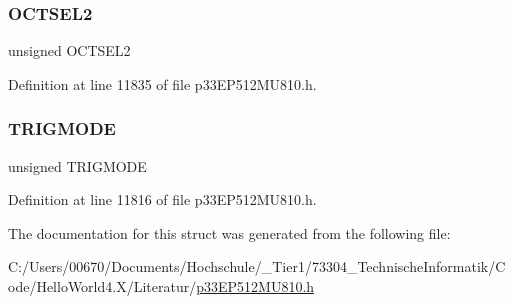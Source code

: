 \subsubsection{\texorpdfstring{O\+C\+T\+S\+E\+L2}{OCTSEL2}}
{\footnotesize\ttfamily unsigned O\+C\+T\+S\+E\+L2}



Definition at line 11835 of file p33\+E\+P512\+M\+U810.\+h.

\mbox{\label{structtag_o_c11_c_o_n1_b_i_t_s_a7a0057e0dca6e2663584b5b9e1da04c3}} 
\subsubsection{\texorpdfstring{T\+R\+I\+G\+M\+O\+DE}{TRIGMODE}}
{\footnotesize\ttfamily unsigned T\+R\+I\+G\+M\+O\+DE}



Definition at line 11816 of file p33\+E\+P512\+M\+U810.\+h.



The documentation for this struct was generated from the following file\+:\begin{DoxyCompactItemize}
\item 
C\+:/\+Users/00670/\+Documents/\+Hochschule/\+\_\+\+Tier1/73304\+\_\+\+Technische\+Informatik/\+Code/\+Hello\+World4.\+X/\+Literatur/\hyperlink{p33_e_p512_m_u810_8h}{p33\+E\+P512\+M\+U810.\+h}\end{DoxyCompactItemize}
